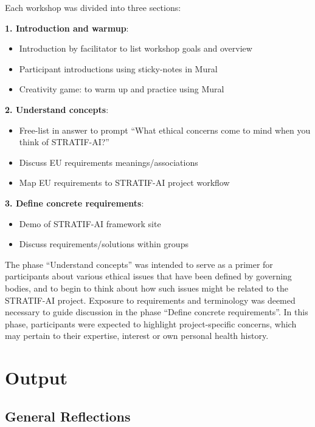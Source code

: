\documentclass[
  letterpaper,
  DIV=11,
  numbers=noendperiod]{scrreport}
\providecommand{\tightlist}{%
  \setlength{\itemsep}{0pt}\setlength{\parskip}{0pt}}\usepackage{longtable,booktabs,array}
\begin{document}
Each workshop was divided into three sections:

\textbf{1. Introduction and warmup}:

\begin{itemize}
\tightlist
\item
  Introduction by facilitator to list workshop goals and overview
\item
  Participant introductions using sticky-notes in Mural
\item
  Creativity game: to warm up and practice using Mural
\end{itemize}

\textbf{2. Understand concepts}:

\begin{itemize}
\tightlist
\item
  Free-list in answer to prompt ``What ethical concerns come to mind
  when you think of STRATIF-AI?''
\item
  Discuss EU requirements meanings/associations
\item
  Map EU requirements to STRATIF-AI project workflow
\end{itemize}

\textbf{3. Define concrete requirements}:

\begin{itemize}
\tightlist
\item
  Demo of STRATIF-AI framework site
\item
  Discuss requirements/solutions within groups
\end{itemize}

The phase ``Understand concepts'' was intended to serve as a primer for
participants about various ethical issues that have been defined by
governing bodies, and to begin to think about how such issues might be
related to the STRATIF-AI project. Exposure to requirements and
terminology was deemed necessary to guide discussion in the phase
``Define concrete requirements''. In this phase, participants were
expected to highlight project-specific concerns, which may pertain to
their expertise, interest or own personal health history.

\hypertarget{output}{%
\section*{Output}\label{output}}


\hypertarget{general-reflections}{%
\subsection*{General Reflections}\label{general-reflections}}
\end{document}
